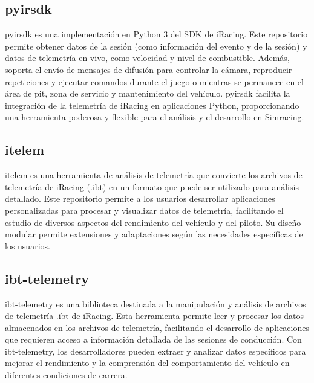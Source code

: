 \subsection{pyirsdk}
pyirsdk \cite{pyirsdk} es una implementación en Python 3 del SDK de iRacing. Este repositorio permite obtener datos de la sesión (como información del evento y de la sesión) y datos de telemetría en vivo, como velocidad y nivel de combustible. Además, soporta el envío de mensajes de difusión para controlar la cámara, reproducir repeticiones y ejecutar comandos durante el juego o mientras se permanece en el área de pit, zona de servicio y mantenimiento del vehículo. pyirsdk facilita la integración de la telemetría de iRacing en aplicaciones Python, proporcionando una herramienta poderosa y flexible para el análisis y el desarrollo en Simracing.

\subsection{itelem}
itelem \cite{itelem} es una herramienta de análisis de telemetría que convierte los archivos de telemetría de iRacing (.ibt) en un formato que puede ser utilizado para análisis detallado. Este repositorio permite a los usuarios desarrollar aplicaciones personalizadas para procesar y visualizar datos de telemetría, facilitando el estudio de diversos aspectos del rendimiento del vehículo y del piloto. Su diseño modular permite extensiones y adaptaciones según las necesidades específicas de los usuarios.

\subsection{ibt-telemetry}
ibt-telemetry \cite{ibt-telemetry} es una biblioteca destinada a la manipulación y análisis de archivos de telemetría .ibt de iRacing. Esta herramienta permite leer y procesar los datos almacenados en los archivos de telemetría, facilitando el desarrollo de aplicaciones que requieren acceso a información detallada de las sesiones de conducción. Con ibt-telemetry, los desarrolladores pueden extraer y analizar datos específicos para mejorar el rendimiento y la comprensión del comportamiento del vehículo en diferentes condiciones de carrera.

